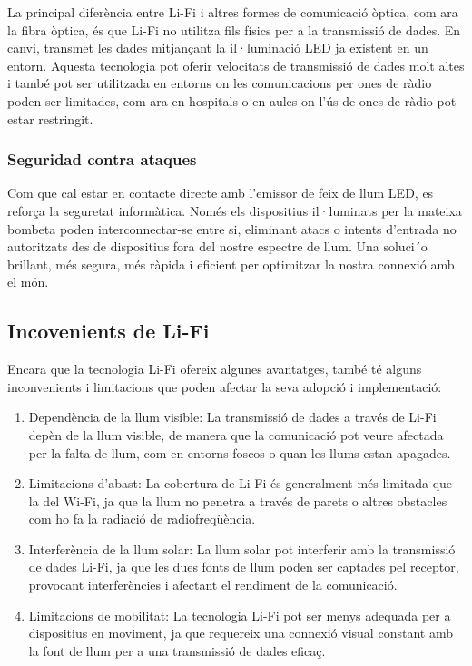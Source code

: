 La principal diferència entre Li-Fi i altres formes de comunicació òptica, com ara la fibra òptica, és que Li-Fi no utilitza fils físics per a la transmissió de dades. En canvi, transmet les dades mitjançant la il·luminació LED ja existent en un entorn. Aquesta tecnologia pot oferir velocitats de transmissió de dades molt altes i també pot ser utilitzada en entorns on les comunicacions per ones de ràdio poden ser limitades, com ara en hospitals o en aules on l'ús de ones de ràdio pot estar restringit.

\subsubsection*{Seguridad contra ataques}

Com que cal estar en contacte directe amb l'emissor de feix de llum LED, es reforça la seguretat
informàtica. Només els dispositius il·luminats per la mateixa bombeta poden interconnectar-se entre si,
eliminant atacs o intents d'entrada no autoritzats des de dispositius fora del nostre espectre de
llum.
Una soluci´o brillant, més segura, més ràpida i eficient per optimitzar la nostra connexió amb el
món.


\subsection*{Incovenients de Li-Fi}

Encara que la tecnologia Li-Fi ofereix algunes avantatges, també té alguns inconvenients i limitacions que poden afectar la seva adopció i implementació:

\begin{enumerate}
    \item Dependència de la llum visible: La transmissió de dades a través de Li-Fi depèn de la llum visible, de manera que la comunicació pot veure afectada per la falta de llum, com en entorns foscos o quan les llums estan apagades.
    \item Limitacions d'abast: La cobertura de Li-Fi és generalment més limitada que la del Wi-Fi, ja que la llum no penetra a través de parets o altres obstacles com ho fa la radiació de radiofreqüència.
    \item Interferència de la llum solar: La llum solar pot interferir amb la transmissió de dades Li-Fi, ja que les dues fonts de llum poden ser captades pel receptor, provocant interferències i afectant el rendiment de la comunicació.
    \item Limitacions de mobilitat: La tecnologia Li-Fi pot ser menys adequada per a dispositius en moviment, ja que requereix una connexió visual constant amb la font de llum per a una transmissió de dades eficaç.
\end{enumerate}



